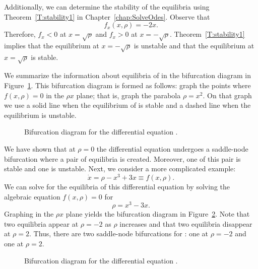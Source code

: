 \documentclass{ximera}
\begin{document}
Additionally, we can determine the stability
of the equilibria using 
Theorem~\ref{T:stability1} in Chapter~\ref{chap:SolveOdes}.  Observe that
\[
f_x(x,\rho) = -2x.
\]
Therefore, $f_x<0$ at $x=\sqrt{\rho}$ and $f_x>0$ at $x=-\sqrt{\rho}$.
Theorem~\ref{T:stability1} implies that the equilibrium at $x=-\sqrt{\rho}$ 
is unstable and that the equilibrium at $x=\sqrt{\rho}$ is stable.

We summarize the information about equilibria of  in the 
bifurcation diagram in Figure~\ref{F:sbifBIF}.  
This bifurcation diagram is formed as follows: graph the points where 
$f(x,\rho)=0$ in the $\rho x$ plane; that is, graph the parabola $\rho=x^2$.  
On that graph we use a solid line when the equilibrium of  is 
stable and a dashed line when the equilibrium is unstable.

\begin{figure}[htb]
           \centerline{%
           }
           \caption{Bifurcation diagram for the differential equation
        \protect{}. }
           \label{F:sbifBIF}
\end{figure}

We have shown that at $\rho=0$ the differential equation  
undergoes a saddle-node bifurcation
where a pair of equilibria is created.  Moreover, one of this pair is stable 
and one is unstable.  Next, we consider a more complicated example:
\begin{equation} \label{E:cbif}
\dot{x} = \rho - x^3 + 3x \equiv f(x,\rho).
\end{equation}
We can solve for the equilibria of this differential equation by solving
the algebraic equation $f(x,\rho)=0$ for
\begin{equation}  \label{E:rho=cubic}
\rho = x^3 - 3x.
\end{equation}
Graphing  in the $\rho x$ plane yields the bifurcation 
diagram in Figure~\ref{F:cbifBIF}.  Note that two equilibria appear at 
$\rho=-2$ as $\rho$ increases and that two equilibria disappear at 
$\rho=2$.  Thus, there are two saddle-node bifurcations for : 
one at $\rho=-2$ and one at $\rho=2$.

\begin{figure}[htb]
           \centerline{%
           }
           \caption{Bifurcation diagram for the differential equation
        \protect{}.}
           \label{F:cbifBIF}
\end{figure} 
\end{document}
